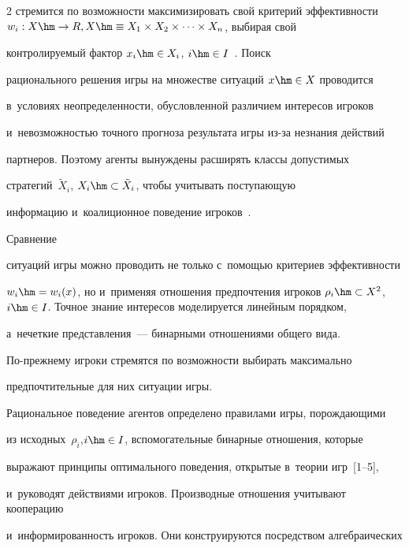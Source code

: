 \begin{multicols}{2}
стремится по воз\-мож\-ности максимизировать свой критерий эф\-фек\-тив\-ности $w_i: 

X\hm\to R, X\hm\equiv X_1\times X_2\times \cdots \times X_n$, выбирая свой 

конт\-ро\-ли\-ру\-емый фактор $x_i\hm\in X_i$, $i\hm\in I$~\cite{1-vas, 2-vas, 5-vas}. Поиск 

рационального решения игры на множестве ситуаций $x\hm\in X$ проводится 

в~условиях не\-опре\-де\-лен\-ности, обуслов\-лен\-ной различием интересов игроков 

и~не\-воз\-мож\-ностью точ\-но\-го прогноза результата игры из-за незнания действий 

парт\-не\-ров. Поэтому агенты вы\-нуж\-де\-ны расширять классы до\-пус\-ти\-мых 

стратегий~$\tilde{X}_i$, $X_i\hm\subset \tilde{X}_i$, чтобы учитывать по\-сту\-па\-ющую 

информацию и~коалиционное поведение игроков~\cite{1-vas, 5-vas}. 



Срав\-не\-ние 

ситуаций игры мож\-но проводить не только с~по\-мощью критериев эф\-фек\-тив\-ности 

$w_i\hm= w_i(x)$, но и~применяя отношения предпочтения игроков $\rho_i\hm\subset 

X^2$, $i\hm\in I$. Точ\-ное знание интересов моделируется линейным порядком, 

а~нечеткие пред\-став\-ле\-ния~--- бинарными отношениями общего вида. 

 По-преж\-не\-му игроки стремятся по воз\-мож\-ности выбирать максимально 

предпочтительные для них ситуации игры. 

    

    Рациональное поведение агентов определено правилами игры, по\-рож\-да\-ющи\-ми 

из исходных~$\rho_i$,\linebreak $i\hm\in I$, вспомогательные бинарные отношения, \mbox{которые} 

выражают принципы оптимального поведения, открытые в~тео\-рии игр~[1--5], 

и~руководят действиями игроков. Производные отношения \mbox{учитывают} кооперацию 

и~ин\-фор\-ми\-ро\-ван\-ность игроков. Они конструируются посредством ал\-геб\-ра\-и\-че\-ских 


\end{multicols}
